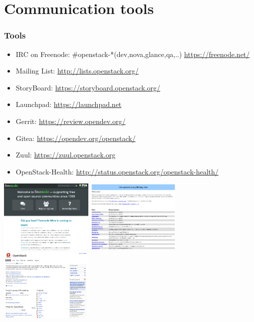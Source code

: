 \documentclass[aspectratio=169,11pt,hyperref={colorlinks=true}]{beamer}
\begin{document}
\section{Communication tools}
\begin{frame}
  \frametitle{Tools}
  \begin{itemize}
    \item IRC on Freenode: \#openstack-*(dev,nova,glance,qa,..) \url{https://freenode.net/}
    \item Mailing List: \url{http://lists.openstack.org/}
    \item StoryBoard: \url{https://storyboard.openstack.org/}
    \item Launchpad: \url{https://launchpad.net}
    \item Gerrit: \url{https://review.opendev.org/}
    \item Gitea: \url{https://opendev.org/openstack/}
    \item Zuul: \url{https://zuul.openstack.org}
    \item OpenStack-Health: \url{http://status.openstack.org/openstack-health/}
  \end{itemize}
  \centering
  \includegraphics[height=35mm]{images/freenode.png}
  \includegraphics[height=35mm]{images/openstack-ml.png}
  \includegraphics[height=35mm]{images/openstack-in-launchpad.png}
\end{frame}
\end{document}
